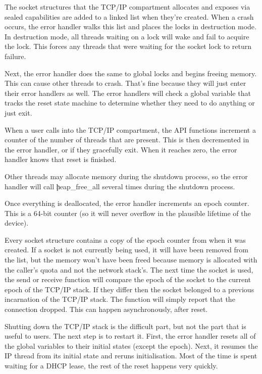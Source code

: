 The socket structures that the TCP/IP compartment allocates and exposes via sealed capabilities are added to a linked list when they're created.
When a crash occurs, the error handler walks this list and places the locks in destruction mode.
In destruction mode, all threads waiting on a lock will wake and fail to acquire the lock.
This forces any threads that were waiting for the socket lock to return failure.

Next, the error handler does the same to global locks and begins freeing memory.
This can cause other threads to crash.
That's fine because they will just enter their error handlers as well.
The error handlers will check a global variable that tracks the reset state machine to determine whether they need to do anything or just exit.

When a user calls into the TCP/IP compartment, the API functions increment a counter of the number of threads that are present.
This is then decremented in the error handler, or if they gracefully exit.
When it reaches zero, the error handler knows that reset is finished.

Other threads may allocate memory during the shutdown process, so the error handler will call \c{heap_free_all} several times during the shutdown process.

Once everything is deallocated, the error handler increments an epoch counter.
This is a 64-bit counter (so it will never overflow in the plausible lifetime of the device).

Every socket structure contains a copy of the epoch counter from when it was created.
If a socket is not currently being used, it will have been removed from the list, but the memory won't have been freed because memory is allocated with the caller's quota and not the network stack's.
The next time the socket is used, the send or receive function will compare the epoch of the socket to the current epoch of the TCP/IP stack.
If they differ then the socket belonged to a previous incarnation of the TCP/IP stack.
The function will simply report that the connection dropped.
This can happen asynchronously, after reset.

Shutting down the TCP/IP stack is the difficult part, but not the part that is useful to users.
The next step is to restart it.
First, the error handler resets all of the global variables to their initial states (except the epoch).
Next, it resumes the IP thread from its initial state and reruns initialisation.
Most of the time is spent waiting for a DHCP lease, the rest of the reset happens very quickly.

